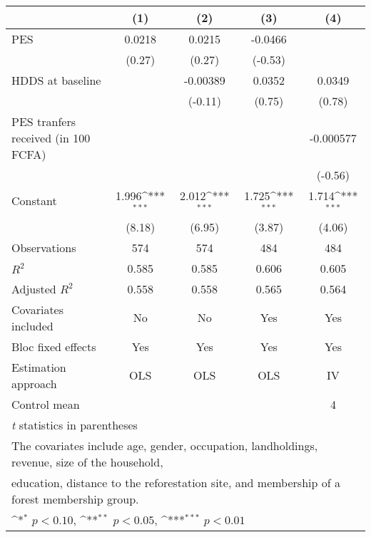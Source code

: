{
\def\sym#1{\ifmmode^{#1}\else\(^{#1}\)\fi}
\begin{tabular}{l*{4}{c}}
\hline\hline
                    &\multicolumn{1}{c}{(1)}         &\multicolumn{1}{c}{(2)}         &\multicolumn{1}{c}{(3)}         &\multicolumn{1}{c}{(4)}         \\
\hline
PES                 &      0.0218         &      0.0215         &     -0.0466         &                     \\
                    &      (0.27)         &      (0.27)         &     (-0.53)         &                     \\
[1em]
HDDS at baseline    &                     &    -0.00389         &      0.0352         &      0.0349         \\
                    &                     &     (-0.11)         &      (0.75)         &      (0.78)         \\
[1em]
PES tranfers received (in 100 FCFA)&                     &                     &                     &   -0.000577         \\
                    &                     &                     &                     &     (-0.56)         \\
[1em]
Constant            &       1.996\sym{***}&       2.012\sym{***}&       1.725\sym{***}&       1.714\sym{***}\\
                    &      (8.18)         &      (6.95)         &      (3.87)         &      (4.06)         \\
\hline
Observations        &         574         &         574         &         484         &         484         \\
\(R^{2}\)           &       0.585         &       0.585         &       0.606         &       0.605         \\
Adjusted \(R^{2}\)  &       0.558         &       0.558         &       0.565         &       0.564         \\
Covariates included &          No         &          No         &         Yes         &         Yes         \\
Bloc fixed effects  &         Yes         &         Yes         &         Yes         &         Yes         \\
Estimation approach &         OLS         &         OLS         &         OLS         &          IV         \\
Control mean        &                     &                     &                     &           4         \\
\hline\hline
\multicolumn{5}{l}{\footnotesize \textit{t} statistics in parentheses}\\
\multicolumn{5}{l}{\footnotesize The covariates include age, gender, occupation, landholdings, revenue, size of the household,}\\
\multicolumn{5}{l}{\footnotesize education, distance to the reforestation site, and membership of a forest membership group.}\\
\multicolumn{5}{l}{\footnotesize \sym{*} \(p<0.10\), \sym{**} \(p<0.05\), \sym{***} \(p<0.01\)}\\
\end{tabular}
}

